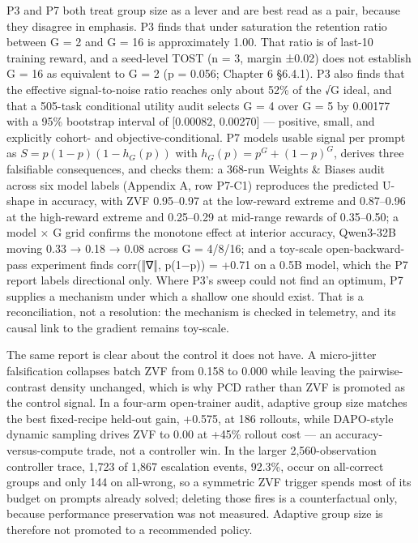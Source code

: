 \documentclass[12pt,a4paper]{report}
\begin{document}
P3 and P7 both treat group size as a lever and are best read as a pair,
because they disagree in emphasis. P3 finds that under saturation the
retention ratio between G = 2 and G = 16 is approximately 1.00. That
ratio is of last-10 training reward, and a seed-level TOST (n = 3,
margin ±0.02) does not establish G = 16 as equivalent to G = 2 (p =
0.056; Chapter 6 §6.4.1). P3 also finds that the effective
signal-to-noise ratio reaches only about 52\% of the √G ideal, and that
a 505-task conditional utility audit selects G = 4 over G = 5 by 0.00177
with a 95\% bootstrap interval of {[}0.00082, 0.00270{]} --- positive,
small, and explicitly cohort- and objective-conditional. P7 models
usable signal per prompt as \(S = p(1-p)(1-h_G(p))\) with
\(h_G(p) = p^G + (1-p)^G\), derives three falsifiable consequences, and
checks them: a 368-run Weights \& Biases audit across six model labels
(Appendix A, row P7-C1) reproduces the predicted U-shape in accuracy,
with ZVF 0.95--0.97 at the low-reward extreme and 0.87--0.96 at the
high-reward extreme and 0.25--0.29 at mid-range rewards of 0.35--0.50; a
model × G grid confirms the monotone effect at interior accuracy,
Qwen3-32B moving 0.33 → 0.18 → 0.08 across G = 4/8/16; and a toy-scale
open-backward-pass experiment finds corr(‖∇‖, p(1−p)) = +0.71 on a 0.5B
model, which the P7 report labels directional only. Where P3's sweep
could not find an optimum, P7 supplies a mechanism under which a shallow
one should exist. That is a reconciliation, not a resolution: the
mechanism is checked in telemetry, and its causal link to the gradient
remains toy-scale.

The same report is clear about the control it does not have. A
micro-jitter falsification collapses batch ZVF from 0.158 to 0.000 while
leaving the pairwise-contrast density unchanged, which is why PCD rather
than ZVF is promoted as the control signal. In a four-arm open-trainer
audit, adaptive group size matches the best fixed-recipe held-out gain,
+0.575, at 186 rollouts, while DAPO-style dynamic sampling drives ZVF to
0.00 at +45\% rollout cost --- an accuracy-versus-compute trade, not a
controller win. In the larger 2,560-observation controller trace, 1,723
of 1,867 escalation events, 92.3\%, occur on all-correct groups and only
144 on all-wrong, so a symmetric ZVF trigger spends most of its budget
on prompts already solved; deleting those fires is a counterfactual
only, because performance preservation was not measured. Adaptive group
size is therefore not promoted to a recommended policy.
\end{document}
